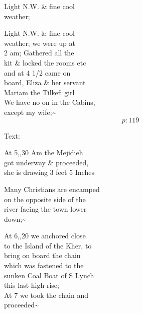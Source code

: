 \documentclass{report}
\begin{document}
	\par{
 	Light N.W. \& fine cool\ \\weather;\ \\
	}

	\par{
 	Light N.W. \& fine cool\ \\weather; we were up at\ \\2 am; Gathered all the\ \\kit \& locked the rooms etc\ \\and at 4 1/2 came on\ \\board, Eliza \& her servant\ \\Mariam the Tilkefi girl\ \\We have no on in the Cabins,\ \\except my wife;\~{}\ \\
  \[p: 119 \]

	}






	\par{
 	Text:\ \\
	}

	\par{
 	At 5,,30 Am the Mejidieh\ \\got underway \& proceeded,\ \\she is drawing 3 feet 5 Inches\ \\
	}

	\par{
 	Many Christians are encamped\ \\on the opposite side of the\ \\river facing the town lower\ \\down;\~{}\ \\
	}

	\par{
 	At 6,,20 we anchored close\ \\to the Island of the Kher, to\ \\bring on board the chain\ \\which was fastened to the\ \\sunken Coal Boat of S Lynch\ \\this last high rise;\ \\At 7 we took the chain and\ \\proceeded\~{}\ \\
	}
\end{document}
